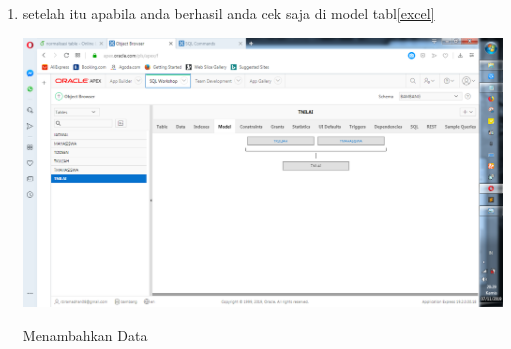 \documentclass{article}
\begin{document}
\begin{enumerate}
    \item setelah itu apabila anda berhasil anda cek saja di model tabl\ref{excel}
    \begin{center}
         \centering
            \includegraphics[scale=0.27]{gambar/16.png}
        \caption{Menambahkan Data}
        \label{excel}
    \end{center}
    
\end{enumerate}
\end{document}
